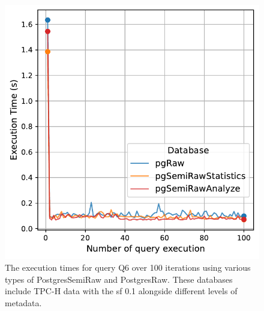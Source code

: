 \begin{figure}[hbt!]
\centering
\includegraphics[width=1.0\linewidth]{charts-eval-exp-time-stat/execution_time_db_type_Q6.pdf}
\caption[Q6:result]{The execution times for query Q6 over 100 iterations using various types of PostgresSemiRaw and PostgresRaw. These databases include TPC-H data with the \acrshort{sf} 0.1 alongside different levels of metadata.}
\label{fig:execution_time_db_type_Q6}
\end{figure}
